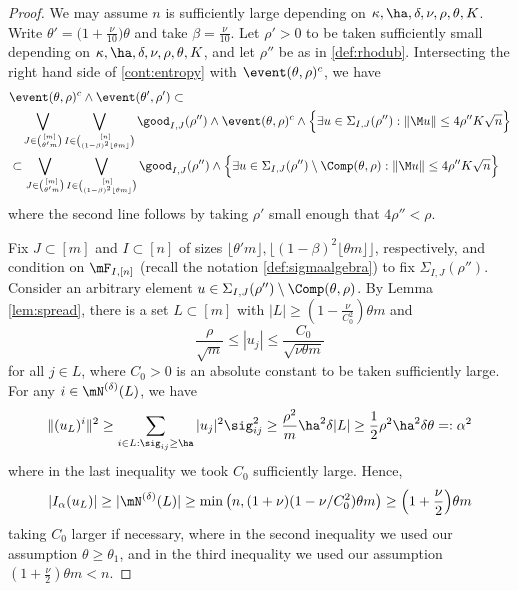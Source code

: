 \documentclass[aop,preprint]{imsart}
\theoremstyle{plain}
\theoremstyle{definition}
\theoremstyle{remark}
\numberwithin{equation}{section}
\numberwithin{theorem}{section}
\def \lf {\lfloor}
\def \rf {\rfloor}
\begin{document}
\begin{proof}
We may assume $n$ is sufficiently large depending on $\kappa,\ha,\delta,\nu,\rho,\theta,K$.
Write $\theta'=\big(1+\frac{\nu}{10}\big)\theta$ and take $\beta=\frac{\nu}{10}$.
Let $\rho'>0$ to be taken sufficiently small depending on $\kappa,\ha,\delta,\nu,\rho,\theta,K$, and let $\rho''$ be as in \eqref{def:rhodub}.
Intersecting the right hand side of \eqref{cont:entropy} with $\event(\theta,\rho)^c$, we have
\begin{align}
&\event(\theta,\rho)^c \wedge \event(\theta',\rho') \subset \notag\\
&\quad
\bigvee_{J\in {[m]\choose  \theta' m }} \bigvee_{I\in {[n]\choose (1-\beta)^2\lf \theta m\rf}}   \good_{I,J}(\rho'')
\wedge\event(\theta,\rho)^c\wedge\Big\{ \exists u \in \Sigma_{I,J}(\rho''): \|\M u\|\le 4\rho''K\sqrt{n} \Big\}\notag\\
&
\subset\bigvee_{J\in {[m]\choose  \theta' m}} \bigvee_{I\in {[n]\choose (1-\beta)^2\lf \theta m\rf}}   \good_{I,J}(\rho'')
\wedge\Big\{ \exists u \in \Sigma_{I,J}(\rho'')\setminus \Comp(\theta,\rho): \|\M u\|\le 4\rho''K\sqrt{n} \Big\}\label{unionIJ}
\end{align}
where the second line follows by taking $\rho'$ small enough that $4\rho''<\rho$.

Fix $J\subset [m]$ and $I\subset[n]$ of sizes $\lf \theta'm\rf,\lf(1-\beta)^2\lf \theta m\rf\rf$, respectively, and condition on $\mF_{I,[n]}$ (recall the notation \eqref{def:sigmaalgebra}) to fix $\Sigma_{I,J}(\rho'')$.
Consider an arbitrary element $u\in \Sigma_{I,J}(\rho'')\setminus \Comp(\theta,\rho)$.
By Lemma \ref{lem:spread}, there is a set $L\subset[m]$ with $|L|\ge (1-\frac{\nu}{C_0^2})\theta m$
and 
\begin{equation}	\label{flat:broad}
\frac{\rho}{\sqrt{m}}\le |u_j|\le \frac{C_0}{\sqrt{\nu\theta m}}
\end{equation}
for all $j\in L$, where $C_0>0$ is an absolute constant to be taken sufficiently large.
For any $i\in \mN^{(\delta)}(L)$, we have
\begin{equation}
\|(u_L)^i\|^2 \ge \sum_{i\in L:\sig_{ij}\ge \ha} |u_j|^2\sig_{ij}^2\ge \frac{\rho^2}{m}\ha^2\delta |L| \ge \frac12\rho^2\ha^2\delta\theta=:\alpha^2
\end{equation}
where in the last inequality we took $C_0$ sufficiently large.
Hence,
\begin{equation}
|I_\alpha(u_L)|\ge |\mN^{(\delta)}(L)| \ge \min\big(n,(1+\nu)(1-\nu/C_0^2)\theta m\big) \ge \Big(1+\frac{\nu}2\Big)\theta m
\end{equation}
taking $C_0$ larger if necessary, where in the second inequality we used our assumption $\theta\ge \theta_1$, and in the third inequality we used our assumption $(1+\frac\nu2)\theta m<n$.


\end{proof}
\end{document}
